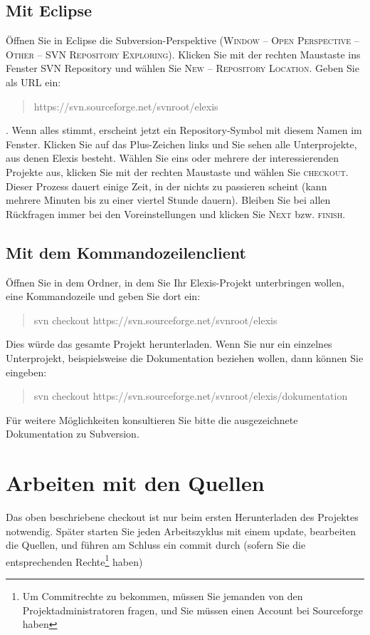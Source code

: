 \subsection{Mit Eclipse}
Öffnen Sie in Eclipse die Subversion-Perspektive (\textsc{Window -- Open
Perspective -- Other -- SVN Repository Exploring}). Klicken Sie mit der rechten
Maustaste ins Fenster \glqq SVN Repository\grqq{} und wählen Sie \textsc{New --
Repository Location}. Geben Sie als URL ein:
\begin{quote}https://svn.sourceforge.net/svnroot/elexis\end{quote}. Wenn alles stimmt, erscheint
jetzt ein Repository-Symbol mit diesem Namen im Fenster. Klicken Sie auf das
Plus-Zeichen links und Sie sehen alle Unterprojekte, aus denen Elexis besteht.
Wählen Sie eins oder mehrere der interessierenden Projekte aus, klicken Sie mit
der rechten Maustaste und wählen Sie \textsc{checkout}. Dieser Prozess dauert
einige Zeit, in der \glqq nichts\grqq{} zu passieren scheint (kann mehrere Minuten
bis zu einer viertel Stunde dauern). Bleiben Sie bei allen Rückfragen immer
bei den Voreinstellungen und klicken Sie \textsc{Next} bzw. \textsc{finish}.
\subsection{Mit dem Kommandozeilenclient}
Öffnen Sie in dem Ordner, in dem Sie Ihr Elexis-Projekt unterbringen wollen,
eine Kommandozeile und geben Sie dort ein: \begin{quote}svn checkout
https://svn.sourceforge.net/svnroot/elexis\end{quote} Dies würde das gesamte Projekt
herunterladen. Wenn Sie nur ein einzelnes Unterprojekt, beispielsweise die
Dokumentation beziehen wollen, dann können Sie eingeben: \begin{quote}svn checkout
https://svn.sourceforge.net/svnroot/elexis/dokumentation\end{quote} Für weitere
Möglichkeiten konsultieren Sie bitte die ausgezeichnete Dokumentation zu
Subversion.

\section{Arbeiten mit den Quellen}
Das oben beschriebene \glqq checkout\grqq{} ist nur beim ersten Herunterladen des
Projektes notwendig. Später starten Sie jeden Arbeitszyklus mit einem \glqq
update\grqq, bearbeiten die Quellen, und führen am Schluss ein \glqq commit\grqq{}
durch (sofern Sie die entsprechenden Rechte\footnote{Um Commitrechte zu
bekommen, müssen Sie jemanden von den Projektadministratoren fragen, und Sie
müssen einen Account bei Sourceforge haben} haben)
